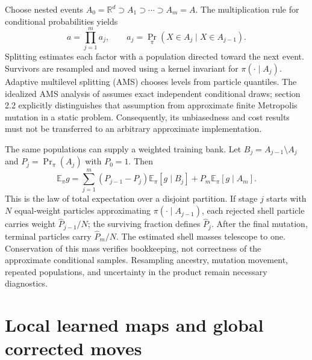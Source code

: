 Choose nested events $A_0=\mathbb R^d\supset A_1\supset\cdots\supset A_m=A$.
The multiplication rule for conditional probabilities yields
\begin{equation}
 a=\prod_{j=1}^m a_j,\qquad
 a_j=\Pr_\pi(X\in A_j\mid X\in A_{j-1}).
 \label{eq:rare-splitting-product}
\end{equation}
Splitting estimates each factor with a population directed toward the next
event. Survivors are resampled and moved using a kernel invariant for
$\pi(\cdot\mid A_j)$. Adaptive multilevel splitting (AMS) chooses levels
from particle quantiles. The idealized AMS analysis of \citet{brehier2015ams} assumes exact
independent conditional draws; section 2.2 explicitly distinguishes that
assumption from approximate finite Metropolis mutation in a static problem.
Consequently, its unbiasedness and cost results must not be transferred to
an arbitrary approximate implementation.

The same populations can supply a weighted training bank. Let
$B_j=A_{j-1}\setminus A_j$ and $P_j=\Pr_\pi(A_j)$ with $P_0=1$. Then
\begin{equation}
 \mathbb E_\pi g
 =\sum_{j=1}^m(P_{j-1}-P_j)\mathbb E_\pi[g\mid B_j]
   +P_m\mathbb E_\pi[g\mid A_m].
 \label{eq:rare-splitting-shells}
\end{equation}
This is the law of total expectation over a disjoint partition. If stage
$j$ starts with $N$ equal-weight particles approximating
$\pi(\cdot\mid A_{j-1})$, each rejected shell particle carries weight
$\widehat P_{j-1}/N$; the surviving fraction defines
$\widehat P_j$. After the final mutation, terminal particles carry
$\widehat P_m/N$. The estimated shell masses telescope to one. Conservation
of this mass verifies bookkeeping, not correctness of the approximate
conditional samples. Resampling ancestry, mutation movement, repeated
populations, and uncertainty in the product remain necessary diagnostics.

\section[Local maps and corrected global moves]{Local learned maps and global corrected moves}

